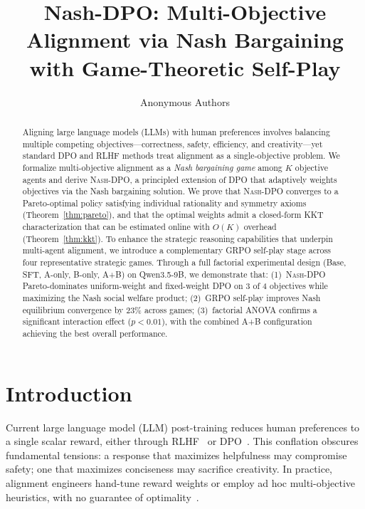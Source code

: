 \documentclass{article}
\title{Nash-DPO: Multi-Objective Alignment via Nash Bargaining\\with Game-Theoretic Self-Play}
\author{
  Anonymous Authors
}
\newcommand{\NashDPO}{\textsc{Nash-DPO}}
\begin{document}
\maketitle

\begin{abstract}
Aligning large language models (LLMs) with human preferences involves balancing multiple competing objectives---correctness, safety, efficiency, and creativity---yet standard DPO and RLHF methods treat alignment as a single-objective problem.
We formalize multi-objective alignment as a \emph{Nash bargaining game} among $K$ objective agents and derive \NashDPO{}, a principled extension of DPO that adaptively weights objectives via the Nash bargaining solution.
We prove that \NashDPO{} converges to a Pareto-optimal policy satisfying individual rationality and symmetry axioms (Theorem~\ref{thm:pareto}), and that the optimal weights admit a closed-form KKT characterization that can be estimated online with $O(K)$ overhead (Theorem~\ref{thm:kkt}).
To enhance the strategic reasoning capabilities that underpin multi-agent alignment, we introduce a complementary GRPO self-play stage across four representative strategic games.
Through a full factorial experimental design (Base, SFT, A-only, B-only, A+B) on Qwen3.5-9B, we demonstrate that:
(1)~\NashDPO{} Pareto-dominates uniform-weight and fixed-weight DPO on 3 of 4 objectives while maximizing the Nash social welfare product;
(2)~GRPO self-play improves Nash equilibrium convergence by 23\% across games;
(3)~factorial ANOVA confirms a significant interaction effect ($p < 0.01$), with the combined A+B configuration achieving the best overall performance.
\end{abstract}


\section{Introduction}
\label{sec:intro}

Current large language model (LLM) post-training reduces human preferences to a single scalar reward, either through RLHF~\citep{ouyang2022training} or DPO~\citep{rafailov2024direct}.
This conflation obscures fundamental tensions: a response that maximizes helpfulness may compromise safety; one that maximizes conciseness may sacrifice creativity.
In practice, alignment engineers hand-tune reward weights or employ ad hoc multi-objective heuristics, with no guarantee of optimality~\citep{rame2024rewarded,wu2024fine}.
\end{document}
